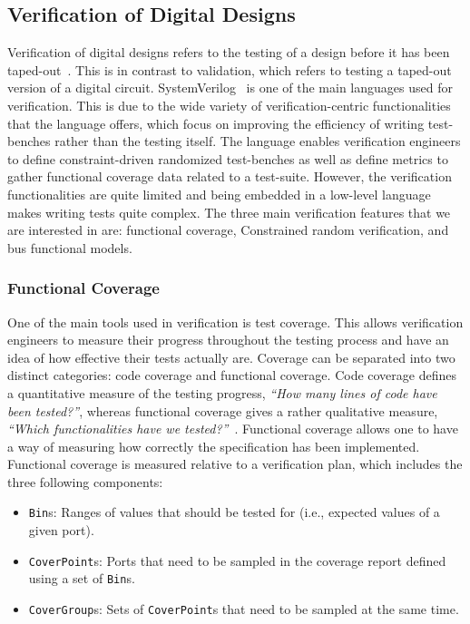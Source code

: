\documentclass[conference]{IEEEtran}
\begin{document}
\subsection{Verification of Digital Designs}
Verification of digital designs refers to the testing of a design before it has been taped-out~\cite{spear2008systemverilog}. This is in contrast to validation, which refers to testing a taped-out version of a digital circuit. 
SystemVerilog~\cite{SystemVerilog} is one of the main languages used for verification.
This is due to the wide variety of verification-centric functionalities that the language offers, which focus on improving the efficiency of writing test-benches rather than the testing itself.
The language enables verification engineers to define constraint-driven randomized test-benches as well as define metrics to gather functional coverage data related to a test-suite. 
However, the verification functionalities are quite limited and being embedded in a low-level language makes writing tests quite complex. 
The three main verification features that we are interested in are: functional coverage, Constrained random verification, and bus functional models.

\subsubsection{Functional Coverage}
One of the main tools used in verification is test coverage. 
This allows verification engineers to measure their progress throughout the testing process and have an idea of how effective their tests actually are. 
Coverage can be separated into two distinct categories: code coverage and functional coverage. 
Code coverage defines a quantitative measure of the testing progress, \textit{``How many lines of code have been tested?''}, whereas functional coverage gives a rather qualitative measure, \textit{``Which functionalities have we tested?''}~\cite{spear2008systemverilog}.
Functional coverage allows one to have a way of measuring how correctly the specification has been implemented. Functional coverage is measured relative to a verification plan, which includes the three following components:

\begin{itemize}
  \item \texttt{Bin}s: Ranges of values that should be tested for (i.e., expected values of a given port).
  \item \texttt{CoverPoint}s: Ports that need to be sampled in the coverage report defined using a set of \texttt{Bin}s.
  \item \texttt{CoverGroup}s: Sets of \texttt{CoverPoint}s that need to be sampled at the same time.
\end{itemize}
\end{document}
